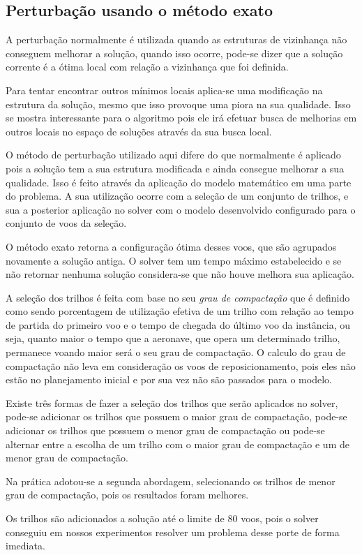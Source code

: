  \subsection{Perturbação usando o método exato}
   
A perturbação normalmente é utilizada quando as estruturas de vizinhança não
conseguem melhorar a solução, quando isso ocorre, pode-se dizer que a
solução corrente é a ótima local com relação a vizinhança que foi definida.
 
Para tentar encontrar outros mínimos locais aplica-se uma modificação na
estrutura da solução, mesmo que isso provoque uma piora na sua qualidade. Isso
se mostra interessante para o algoritmo pois ele irá efetuar busca de melhorias
em outros locais no espaço de soluções através da sua busca local.
 
O método de perturbação utilizado aqui difere do que normalmente é aplicado
pois a solução tem a sua estrutura modificada e ainda consegue melhorar a sua
qualidade. Isso é feito através da aplicação do modelo matemático em uma
parte do problema. A sua utilização ocorre com a seleção de um conjunto de
trilhos, e sua a posterior aplicação no solver com o modelo desenvolvido
configurado para o conjunto de voos da seleção.

O método exato retorna a configuração ótima desses voos, que
são agrupados novamente a solução antiga. O solver tem um tempo máximo
estabelecido e se não retornar nenhuma solução considera-se que não houve
melhora sua aplicação.

A seleção dos trilhos é feita com base no seu
\textit{grau de compactação} que é definido como sendo porcentagem de
utilização efetiva de um trilho com relação ao tempo de partida do primeiro voo
e o tempo de chegada do último voo da instância, ou seja, quanto maior o tempo
que a aeronave, que opera um determinado trilho, permanece voando maior será o
seu grau de compactação. O calculo do grau de compactação não leva em
consideração os voos de reposicionamento, pois eles não estão no planejamento
inicial e por sua vez não são passados para o modelo.

Existe três formas de fazer a seleção dos trilhos que serão aplicados no solver,
pode-se adicionar os trilhos que possuem o maior grau de compactação, pode-se
adicionar os trilhos que possuem o menor grau de compactação ou pode-se alternar
entre a escolha de um trilho com o maior grau de compactação e um de menor grau
de compactação.

Na prática adotou-se a segunda abordagem, selecionando os trilhos de menor grau
de compactação, pois os resultados foram melhores.
 
Os trilhos são adicionados a solução até o limite de 80 voos, pois o solver
conseguiu em nossos experimentos resolver um problema desse porte de forma
imediata. 


 
 